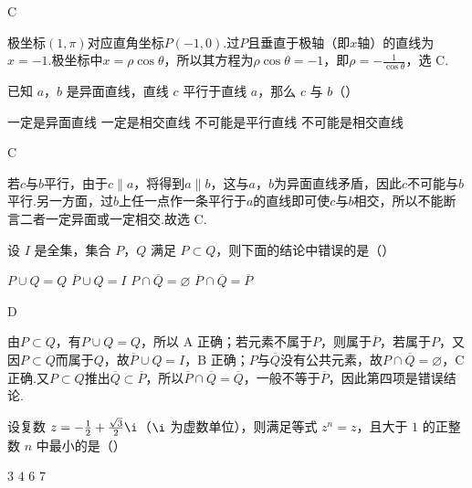 \begin{answer}
C
\end{answer}

\begin{solution}
极坐标\((1,\pi)\)对应直角坐标\(P(-1,0)\).过\(P\)且垂直于极轴（即\(x\)轴）的直线为\(x=-1\).极坐标中\(x=\rho\cos\theta\)，所以其方程为\(\rho\cos\theta=-1\)，即\(\rho=-\frac{1}{\cos\theta}\)，选 C.
\end{solution}

\begin{problem}
已知 \(a\)，\(b\) 是异面直线，直线 \(c\) 平行于直线 \(a\)，那么 \(c\) 与 \(b\)（\quad）

\choices
    {一定是异面直线}
    {一定是相交直线}
    {不可能是平行直线}
    {不可能是相交直线}
\end{problem}

\begin{answer}
C
\end{answer}

\begin{solution}
若\(c\)与\(b\)平行，由于\(c\parallel a\)，将得到\(a\parallel b\)，这与\(a\)，\(b\)为异面直线矛盾，因此\(c\)不可能与\(b\)平行.另一方面，过\(b\)上任一点作一条平行于\(a\)的直线即可使\(c\)与\(b\)相交，所以不能断言二者一定异面或一定相交.故选 C.
\end{solution}

\begin{problem}
设 \(I\) 是全集，集合 \(P\)，\(Q\) 满足 \(P \subset Q\)，则下面的结论中错误的是（\quad）

\choices
    {\(P \cup Q = Q\)}
    {\(\overline{P} \cup Q = I\)}
    {\(P \cap \overline{Q} = \varnothing\)}
    {\(\overline{P} \cap \overline{Q} = \overline{P}\)}
\end{problem}

\begin{answer}
D
\end{answer}

\begin{solution}
由\(P\subset Q\)，有\(P\cup Q=Q\)，所以 A 正确；若元素不属于\(P\)，则属于\(\overline P\)，若属于\(P\)，又因\(P\subset Q\)而属于\(Q\)，故\(\overline P\cup Q=I\)，B 正确；\(P\)与\(\overline Q\)没有公共元素，故\(P\cap\overline Q=\varnothing\)，C 正确.又\(P\subset Q\)推出\(\overline Q\subset\overline P\)，所以\(\overline P\cap\overline Q=\overline Q\)，一般不等于\(\overline P\)，因此第四项是错误结论.
\end{solution}

\begin{problem}
设复数 \(z = -\frac{1}{2} + \frac{\sqrt{3}}{2}\i\)（\(\i\) 为虚数单位），则满足等式 \(z^n = z\)，且大于 \(1\) 的正整数 \(n\) 中最小的是（\quad）

\choices
    {\(3\)}
    {\(4\)}
    {\(6\)}
    {\(7\)}
\end{problem}


